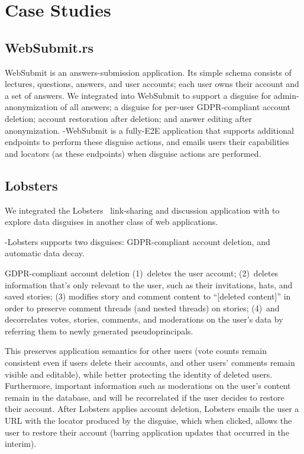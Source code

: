 \section{Case Studies}

\subsection{WebSubmit.rs}
WebSubmit is an answers-submission application. Its simple schema consists of lectures, questions,
answers, and user accounts; each user owns their account and a set of answers. We integrated \sys
into WebSubmit to support a disguise for admin-anonymization of all answers; a disguise for per-user
GDPR-compliant account deletion; account restoration after deletion; and answer editing after
anonymization.  \sys-WebSubmit is a fully-E2E application that supports additional endpoints to
perform these disguise actions, and emails users their capabilities and locators (as these
endpoints) when disguise actions are performed.

\subsection{Lobsters} 
We integrated the Lobsters~\cite{lobsters} link-sharing and discussion
application with \sys to explore data disguises in another class of web applications.

\sys-Lobsters supports two disguises: GDPR-compliant account deletion, and automatic data decay.

GDPR-compliant account deletion 
%
(1)~deletes the user account;
%
(2)~deletes information that's only relevant to the user, such as their invitations, hats, and saved
stories;
%
(3) modifies story and comment content to ``[deleted content]'' in order to preserve comment threads
(and nested threads) on stories;
%
(4)~and decorrelates votes, stories, comments, and moderations on the user's data by referring them
to newly generated pseudoprincipals.
%

This preserves application semantics for other users (\eg vote counts remain consistent even if
users delete their accounts, and other users' comments remain visible and editable), while better
protecting the identity of deleted users.  Furthermore, important information such as moderations on
the user's content remain in the database, and will be recorrelated if the user decides to restore
their account.  After Lobsters applies account deletion, Lobsters emails the user a URL with the
locator produced by the disguise, which when clicked, allows the user to restore their account
(barring application updates that occurred in the interim).

